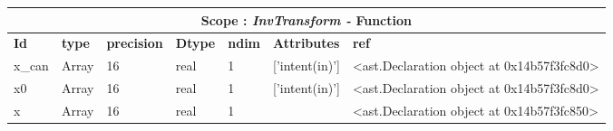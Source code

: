 \documentclass{report}
\begin{document}
 \vspace{1cm}

\begin{center}
\begin{longtable}{|p{3.5cm}|p{1.5cm}|p{1.5cm}|p{1.5cm}|p{1cm}|p{2cm}|p{4cm}| }
\hline
\multicolumn{7}{|c|}{\textbf{Scope : \qquad}  \textbf{\textit{InvTransform - }Function}}\\ 
\hline
\textbf{Id} & \textbf{type} & \textbf{precision} & \textbf{Dtype} & \textbf{ndim} & \textbf{Attributes} & \textbf{ref} \\\hline

x\_can & Array & 16 & real & 1 & ['intent(in)'] & <ast.Declaration object at 0x14b57f3fc8d0> \\\hline

x0 & Array & 16 & real & 1 & ['intent(in)'] & <ast.Declaration object at 0x14b57f3fc8d0> \\\hline

x & Array & 16 & real & 1 &  & <ast.Declaration object at 0x14b57f3fc850> \\\hline

\end{longtable}
\end{center}

 \vspace{1cm}
\end{document}

